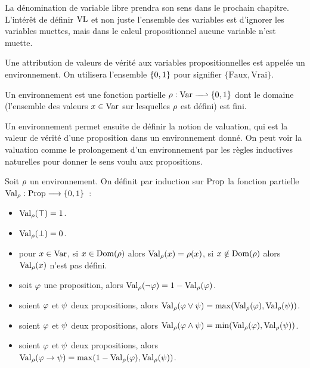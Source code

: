 \begin{remark}
  La dénomination de variable \og libre\fg{} prendra son sens dans le prochain
  chapitre. L'intérêt de définir $\operatorname{VL}$ et non juste l'ensemble des variables est
  d'ignorer les variables muettes, mais dans le calcul propositionnel aucune
  variable n'est muette.
\end{remark}

Une attribution de valeurs de vérité aux variables propositionnelles est appelée
un environnement. On utilisera l'ensemble $\{0,1\}$ pour signifier
$\{\mathrm{Faux},\mathrm{Vrai}\}$.

\begin{definition}[Environnement]
  Un environnement est une fonction partielle
  $\makeFunNamePartial{\env}{\Var}{\intB}$
  dont le domaine (l'ensemble des valeurs $x\in \operatorname{Var}$ sur lesquelles
  $\rho$ est défini) est fini.
\end{definition}

Un environnement permet ensuite de définir la notion de valuation, qui est la
valeur de vérité d'une proposition dans un environnement donné. On peut voir
la valuation comme le prolongement d'un environnement par les règles inductives
naturelles pour donner le sens voulu aux propositions.

\begin{definition}[Valuation]
  Soit $\rho$ un environnement. On définit par induction sur $\operatorname{Prop}$
  la fonction partielle $\operatorname{Val}_{\rho} : \displaystyle \operatorname{Prop} \longrightarrow \{0,1\}$~:
  \begin{itemize}
  \item $\operatorname{Val}_{\rho}(\top) = 1$.
  \item $\operatorname{Val}_{\rho}(\bot) = 0$.
  \item pour $x\in \operatorname{Var}$, si $x\in \operatorname{Dom}(\rho)$ alors
    $\operatorname{Val}_{\rho} (x)= \rho(x)$, si $x\notin \operatorname{Dom}(\rho)$ alors
    $\operatorname{Val}_{\rho} (x)$ n'est pas défini.
  \item soit $\varphi$ une proposition, alors
    $\operatorname{Val}_{\rho}(\lnot \varphi) = 1 - \operatorname{Val}_{\rho}(\varphi)$.
  \item soient $\varphi$ et $\psi$ deux propositions, alors
    $\operatorname{Val}_{\rho}(\varphi\lor \psi)=\max(\operatorname{Val}_{\rho}(\varphi),\operatorname{Val}_{\rho}(\psi))$.
  \item soient $\varphi$ et $\psi$ deux propositions, alors
    $\operatorname{Val}_{\rho}(\varphi\land \psi)=\min(\operatorname{Val}_{\rho}(\varphi),\operatorname{Val}_{\rho}(\psi))$.
  \item soient $\varphi$ et $\psi$ deux propositions, alors
    $\operatorname{Val}_{\rho}(\varphi\to \psi) = \max(1 - \operatorname{Val}_{\rho}(\varphi),\operatorname{Val}_{\rho}(\psi))$.
  \end{itemize}
\end{definition}

